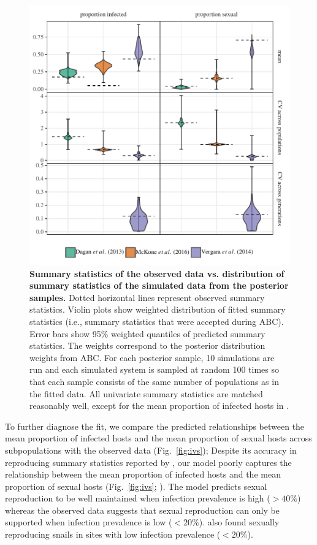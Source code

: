 \documentclass{article}\usepackage[]{graphicx}\usepackage[]{color}
\newcommand{\fref}[1]{Fig.~\ref{fig:#1}}
\begin{document}
\begin{figure}[!ht]
\includegraphics[width=\textwidth]{../fig/smc_summary.pdf}
\caption{{\bf Summary statistics of the observed data vs. distribution of summary statistics of the simulated data from the posterior samples.}
Dotted horizontal lines represent observed summary statistics.
Violin plots show weighted distribution of fitted summary statistics (i.e., summary statistics that were accepted during ABC). 
Error bars show 95\% weighted quantiles of predicted summary statistics.
The weights correspond to the posterior distribution weights from ABC.
For each posterior sample, 10 simulations are run and each simulated system is sampled at random 100 times so that each sample consists of the same number of populations as in the fitted data.
All univariate summary statistics are matched reasonably well, except for the mean proportion of infected hosts in \cite{mckone2016fine}.
}
\label{fig:smcsumm}
\end{figure}

To further diagnose the fit, we compare the predicted relationships between the mean proportion of infected hosts and the mean proportion of sexual hosts across subpopulations with the observed data (\fref{ivs});
Despite its accuracy in reproducing summary statistics reported by \cite{dagan2013clonal}, 
our model poorly captures the relationship between the mean proportion of infected hosts and the mean proportion of sexual hosts (\fref{ivs}; \cite{dagan2013clonal}).
The model predicts sexual reproduction to be well maintained when infection prevalence is high ($> 40\%$) whereas
the observed data \citep{dagan2013clonal} suggests that sexual reproduction can only be supported when infection prevalence is low ($< 20\%$).
\cite{mckone2016fine} also found sexually reproducing snails in sites with low infection prevalence ($< 20\%$).
\end{document}
